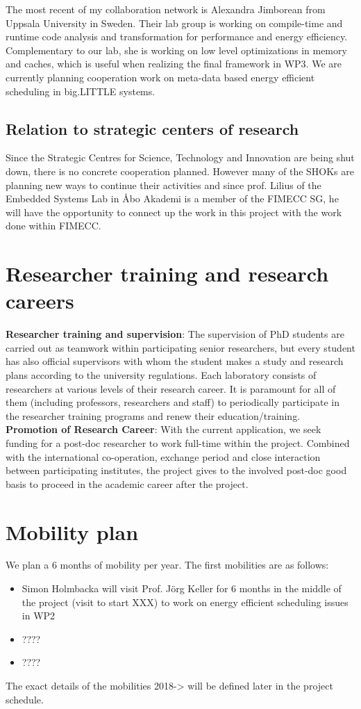 \documentclass{article}
\begin{document}
The most recent of my collaboration network is Alexandra Jimborean from Uppsala University in Sweden.
Their lab group is working on compile-time and runtime code analysis and transformation for performance and energy efficiency.
Complementary to our lab, she is working on low level optimizations in memory and caches, which is useful when realizing the final framework in WP3.
We are currently planning cooperation work on meta-data based energy efficient scheduling in big.LITTLE systems.

\subsection{Relation to strategic centers of research}
Since the Strategic Centres for Science, Technology and Innovation are being shut down, there is no concrete cooperation planned. 
However many of the SHOKs are planning new ways to continue their activities and since prof. Lilius of the Embedded Systems Lab in \AA{}bo Akademi is a member of the FIMECC SG, 
he will have the opportunity to connect up the work in this project with the work done within FIMECC.


\section{Researcher training and research careers}
\textbf{Researcher training and supervision}: The supervision of PhD students are carried out as teamwork within participating senior researchers, 
but every student has also official supervisors with whom the student makes a study and research plans according to the university regulations. 
Each laboratory consists of researchers at various levels of their research career. 
It is paramount for all of them (including professors, researchers and staff) to periodically participate in the researcher training programs and renew their education/training.\\ 
\textbf{Promotion of Research Career}: With the current application, we seek funding for a post-doc researcher to work full-time within the project. 
Combined with the international co-operation, exchange period and close interaction between participating institutes, the project gives to the involved post-doc good basis to proceed in the academic career after the project.

\section{Mobility plan}
We plan a 6 months of mobility per year. The first mobilities are as follows:
\begin{itemize}
 \item Simon Holmbacka will visit Prof. Jörg Keller for 6 months in the middle
of the project (visit to start XXX) to work on energy efficient scheduling issues in WP2
\item ????
\item ????

\end{itemize}


The exact details of the mobilities 2018-> will be defined later in the project
schedule.






\end{document}
